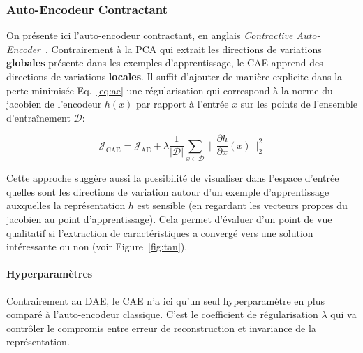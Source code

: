 

\subsubsection{Auto-Encodeur Contractant}

On présente ici l'auto-encodeur contractant, en anglais \textit{Contractive
Auto-Encoder}~\citep{Rifai+al-2011}. Contrairement à la PCA qui extrait les
directions de variations \textbf{globales} présente dans les exemples
d'apprentissage, le CAE apprend des directions de variations \textbf{locales}.
Il suffit d'ajouter de manière explicite dans la perte minimisée
Eq.~\ref{eq:ae} une régularisation qui correspond à la norme du jacobien de
l'encodeur $h(x)$ par rapport à l'entrée $x$ sur les points de l'ensemble
d'entraînement $\mathcal{D}$:

\begin{equation}
\mathcal{J}_\textrm{CAE} = \mathcal{J}_\textrm{AE} + \lambda\frac{1}{\vert \mathcal{D}\vert}\sum_{x\in\mathcal{D}}\| \frac{\partial h}{\partial x}(x)\|_2^2
\label{eq:cae}
\end{equation}

Cette approche suggère aussi la possibilité de visualiser dans l'espace
d'entrée quelles sont les directions de variation autour d'un exemple
d'apprentissage auxquelles la représentation $h$ est sensible  (en regardant
les vecteurs propres du jacobien au point d'apprentissage). Cela permet
d'évaluer d'un point de vue qualitatif si l'extraction de caractéristiques a
convergé vers une solution intéressante ou non (voir Figure~\ref{fig:tan}).

\paragraph{Hyperparamètres} Contrairement au DAE, le CAE n'a ici qu'un seul
hyperparamètre en plus comparé à l'auto-encodeur classique. C'est le
coefficient de régularisation $\lambda$ qui va contrôler le compromis entre
erreur de reconstruction et invariance de la représentation.

